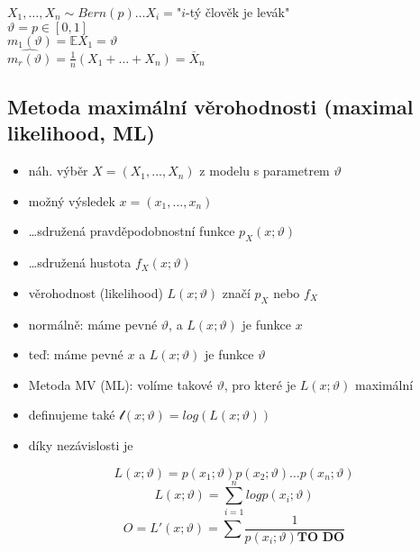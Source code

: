 \documentclass[../main.tex]{subfiles}
\begin{document}
\begin{example}
    $X_1,\dots,X_n \sim Bern(p) \dots X_i = $"$i$-tý člověk je levák"\\
    $\vartheta = p \in \left[0,1\right]$\\
    $m_1(\vartheta) = \mathbb{E}X_1 = \vartheta$\\
    $\widehat{m_r(\vartheta)} = \frac{1}{n}(X_1+\dots+X_n) = \overline{X}_n$
\end{example}

\subsection{Metoda maximální věrohodnosti (maximal likelihood, ML)}
\begin{itemize}
    \item náh. výběr $X = (X_1,\dots,X_n)$ z modelu s parametrem $\vartheta$
    \item možný výsledek $x = (x_1,\dots,x_n)$
    \item \dots sdružená pravděpodobnostní funkce $p_X(x;\vartheta)$
    \item \dots sdružená hustota $f_X(x;\vartheta)$
    \item věrohodnost (likelihood) $L(x;\vartheta)$ značí $p_X$ nebo $f_X$
    \item normálně: máme pevné $\vartheta$, a $L(x;\vartheta)$ je funkce $x$
    \item teď: máme pevné $x$ a $L(x;\vartheta)$ je funkce $\vartheta$
\end{itemize}
\begin{itemize}
    \item Metoda MV (ML): volíme takové $\vartheta$, pro které je $L(x;\vartheta)$ maximální
    \item definujeme také $\mathcal{l}(x;\vartheta) = log(L(x;\vartheta))$
    \item díky nezávislosti je
\end{itemize}
\[L(x;\vartheta) = p(x_1;\vartheta)p(x_2;\vartheta)\dots p(x_n;\vartheta)\]
\[L(x;\vartheta) = \sum^n_{i=1} log p(x_i;\vartheta)\]
\[ O = L'(x;\vartheta) = \sum \frac{1}{p(x_i;\vartheta) \textbf{TO DO}}\]
\end{document}

